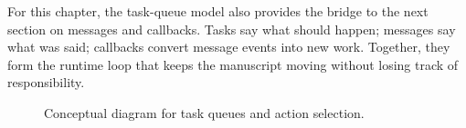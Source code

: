 \documentclass[11pt]{article}
\begin{document}
For this chapter, the task-queue model also provides the bridge to the next section on messages and callbacks. Tasks say what should happen; messages say what was said; callbacks convert message events into new work. Together, they form the runtime loop that keeps the manuscript moving without losing track of responsibility.

\begin{figure}[htbp]
\centering

\caption{Conceptual diagram for task queues and action selection.}
\end{figure}
\end{document}
